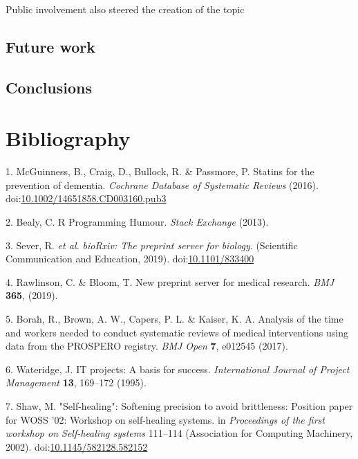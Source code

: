 \documentclass[a4paper, twoside]{templates/ociamthesis}
\begin{document}
Public involvement also steered the creation of the topic

\hypertarget{future-work}{%
\section{Future work}\label{future-work}}

\hypertarget{conclusions}{%
\section{Conclusions}\label{conclusions}}

\hypertarget{bibliography}{%
\chapter{Bibliography}\label{bibliography}}

\hypertarget{refs}{}
\leavevmode\hypertarget{ref-mcguinness2016b}{}%
1. McGuinness, B., Craig, D., Bullock, R. \& Passmore, P. Statins for the prevention of dementia. \emph{Cochrane Database of Systematic Reviews} (2016). doi:\href{https://doi.org/10.1002/14651858.CD003160.pub3}{10.1002/14651858.CD003160.pub3}

\leavevmode\hypertarget{ref-bealy2013}{}%
2. Bealy, C. R Programming Humour. \emph{Stack Exchange} (2013).

\leavevmode\hypertarget{ref-sever2019}{}%
3. Sever, R. \emph{et al.} \emph{bioRxiv: The preprint server for biology}. (Scientific Communication and Education, 2019). doi:\href{https://doi.org/10.1101/833400}{10.1101/833400}

\leavevmode\hypertarget{ref-rawlinson2019}{}%
4. Rawlinson, C. \& Bloom, T. New preprint server for medical research. \emph{BMJ} \textbf{365}, (2019).

\leavevmode\hypertarget{ref-borah2017}{}%
5. Borah, R., Brown, A. W., Capers, P. L. \& Kaiser, K. A. Analysis of the time and workers needed to conduct systematic reviews of medical interventions using data from the PROSPERO registry. \emph{BMJ Open} \textbf{7}, e012545 (2017).

\leavevmode\hypertarget{ref-wateridge1995}{}%
6. Wateridge, J. IT projects: A basis for success. \emph{International Journal of Project Management} \textbf{13}, 169--172 (1995).

\leavevmode\hypertarget{ref-shaw2002}{}%
7. Shaw, M. "Self-healing": Softening precision to avoid brittleness: Position paper for WOSS '02: Workshop on self-healing systems. in \emph{Proceedings of the first workshop on Self-healing systems} 111--114 (Association for Computing Machinery, 2002). doi:\href{https://doi.org/10.1145/582128.582152}{10.1145/582128.582152}
\end{document}
